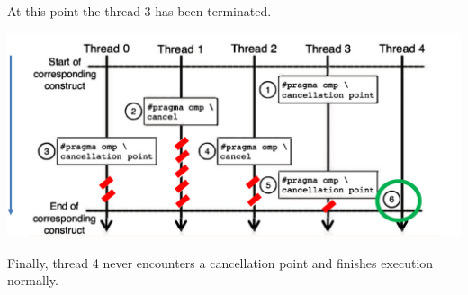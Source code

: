 \begin{examplebox}
    At this point the thread 3 has been terminated.
    \begin{center}
        \includegraphics[width=\textwidth]{img/openmp-cancel-6.pdf}
    \end{center}

    Finally, thread 4 never encounters a cancellation point and finishes execution normally.
\end{examplebox}